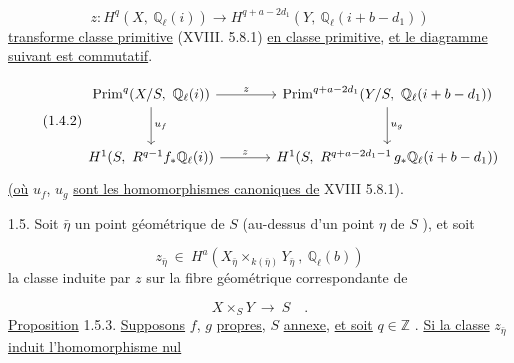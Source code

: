 \begin{equation}\tag{1.4.1}
z : H^q(X,\ \mathbb{Q}_\ell(i)) \longrightarrow H^{q+a-2d_1} (Y,\ \mathbb{Q}_\ell(i+b-d_1))
\end{equation}
\underline{transforme classe primitive} (XVIII. 5.8.1) \underline{en classe primitive}, \underline{et le diagramme suivant est commutatif}.



\begin{equation}\tag{1.4.2}
\begin{tikzcd}[column sep=large, row sep=large]
\mathrm{Prim}^{q}(X/S,\ \mathbb{Q}_\ell(i)) \arrow[r, "z"] \arrow[d, "u_f"] & \mathrm{Prim}^{q+a-2d_1}(Y/S,\ \mathbb{Q}_\ell(i+b-d_1)) \arrow[d, "u_g"] \\
H^{1}(S,\ R^{q-1}f_*\mathbb{Q}_\ell(i)) \arrow[r, "z"] & H^{1}(S,\ R^{q+a-2d_1-1}\,g_*\mathbb{Q}_\ell(i+b-d_1))
\end{tikzcd}
\end{equation}
\underline{(où} $u_f$, $u_g$ \underline{sont les homomorphismes canoniques de} XVIII 5.8.1).

1.5. Soit $\bar{\eta}$ un point géométrique de $S$ (au-dessus d'un point $\eta$ de $S$ ), et soit

\begin{equation}\tag{1.5.1}
z_{\bar{\eta}} \ \in \ H^{a}(X_{\bar{\eta}} \times_{k(\bar{\eta})} Y_{\bar{\eta}} \ , \ \mathbb{Q}_\ell(b))
\end{equation}
la classe induite par $z$ sur la fibre géométrique correspondante de

\begin{equation}\tag{1.5.2}
X \times_S Y \ \longrightarrow \ S \quad .
\end{equation}
\underline{Proposition} 1.5.3. \underline{Supposons} $f$, $g$ \underline{propres,} $S$ \underline{annexe}, \underline{et soit} $q \in \mathbb{Z}$ . \underline{Si la classe} $z_{\bar{\eta}}$ \underline{induit l'homomorphisme nul}

